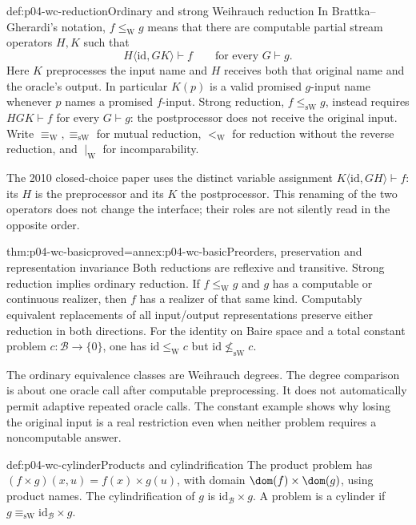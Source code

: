 \begin{hbdefinition}{def:p04-wc-reduction}{Ordinary and strong Weihrauch reduction}
In Brattka--Gherardi's notation, \(f\leq_{\mathrm W} g\) means that there
are computable partial stream operators \(H,K\) such that
\[
 H\langle\mathrm{id},GK\rangle\vdash f
                         \qquad\text{for every }G\vdash g.
\]
Here \(K\) preprocesses the input name and \(H\) receives both
that original name and the oracle's output. In particular \(K(p)\)
is a valid promised \(g\)-input name whenever \(p\) names a
promised \(f\)-input. Strong reduction, \(f\leq_{\mathrm{sW}}g\), instead
requires \(HGK\vdash f\) for every \(G\vdash g\): the
postprocessor does not receive the original input.
Write \(\equiv_{\mathrm W},\equiv_{\mathrm{sW}}\) for mutual reduction,
\(<_{\mathrm W}\) for reduction without the reverse reduction, and
\(\mid_{\mathrm W}\) for incomparability.

The 2010 closed-choice paper uses the distinct variable assignment
\(K\langle\mathrm{id},GH\rangle\vdash f\): its \(H\) is the
preprocessor and its \(K\) the postprocessor. This renaming of
the two operators does not change the interface; their roles are not
silently read in the opposite order.
\end{hbdefinition}

\begin{hbtheorem}{thm:p04-wc-basic}{proved=annex:p04-wc-basic}{Preorders, preservation and representation invariance}
Both reductions are reflexive and transitive. Strong reduction implies
ordinary reduction. If \(f\leq_{\mathrm W} g\) and \(g\) has a computable
or continuous realizer, then \(f\) has a realizer of that same kind.
Computably equivalent replacements of all input/output representations
preserve either reduction in both directions.
For the identity on Baire space and a total constant problem
\(c:\mathcal B\to\{0\}\), one has
\(\mathrm{id}\leq_{\mathrm W} c\) but
\(\mathrm{id}\not\leq_{\mathrm{sW}}c\).
\end{hbtheorem}

The ordinary equivalence classes are Weihrauch degrees. The degree
comparison is about one oracle call after computable preprocessing.
It does not automatically permit adaptive repeated oracle calls.
The constant example shows why losing the original input is a real
restriction even when neither problem requires a noncomputable answer.

\begin{hbdefinition}{def:p04-wc-cylinder}{Products and cylindrification}
The product problem has
\((f\times g)(x,u)=f(x)\times g(u)\), with domain
\(\dom(f)\times\dom(g)\), using product names.
The cylindrification of \(g\) is \(\mathrm{id}_{\mathcal B}\times g\).
A problem is a cylinder if
\(g\equiv_{\mathrm{sW}}\mathrm{id}_{\mathcal B}\times g\).
\end{hbdefinition}

